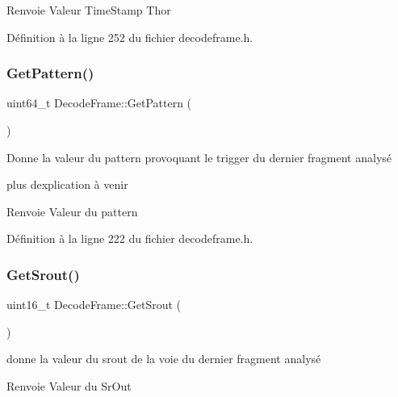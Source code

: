 \begin{DoxyReturn}{Renvoie}
Valeur Time\+Stamp Thor 
\end{DoxyReturn}


Définition à la ligne 252 du fichier decodeframe.\+h.

\mbox{\label{class_decode_frame_a036d1c2974dc06c43ee945b7586a14d6}} 
\subsubsection{\texorpdfstring{Get\+Pattern()}{GetPattern()}}
{\footnotesize\ttfamily uint64\+\_\+t Decode\+Frame\+::\+Get\+Pattern (\begin{DoxyParamCaption}{ }\end{DoxyParamCaption})\hspace{0.3cm}{\ttfamily [inline]}}



Donne la valeur du pattern provoquant le trigger du dernier fragment analysé 

plus d\textquotesingle{}explication à venir \begin{DoxyReturn}{Renvoie}
Valeur du pattern 
\end{DoxyReturn}


Définition à la ligne 222 du fichier decodeframe.\+h.

\mbox{\label{class_decode_frame_a7418f106eb0998d886ce5849cfb031d9}} 
\subsubsection{\texorpdfstring{Get\+Srout()}{GetSrout()}}
{\footnotesize\ttfamily uint16\+\_\+t Decode\+Frame\+::\+Get\+Srout (\begin{DoxyParamCaption}{ }\end{DoxyParamCaption})\hspace{0.3cm}{\ttfamily [inline]}}



donne la valeur du srout de la voie du dernier fragment analysé 

\begin{DoxyReturn}{Renvoie}
Valeur du Sr\+Out 
\end{DoxyReturn}


